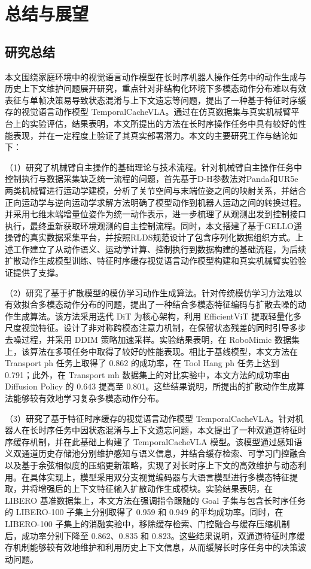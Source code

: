 \chapter{总结与展望}
\label{chp:conclusion}

\section{研究总结}
\label{sec:conclusion}

本文围绕家庭环境中的视觉语言动作模型在长时序机器人操作任务中的动作生成与历史上下文维护问题展开研究，重点针对非结构化环境下多模态动作分布难以有效表征与单帧决策易导致状态混淆与上下文遗忘等问题，提出了一种基于特征时序缓存的视觉语言动作模型 TemporalCacheVLA。通过在仿真数据集与真实机械臂平台上的实验评估，结果表明，本文所提出的方法在长时序操作任务中具有较好的性能表现，并在一定程度上验证了其真实部署潜力。本文的主要研究工作与结论如下：

（1）研究了机械臂自主操作的基础理论与技术流程。针对机械臂自主操作任务中控制执行与数据采集缺乏统一流程的问题，首先基于D-H参数法对Panda和UR5e两类机械臂进行运动学建模，分析了关节空间与末端位姿之间的映射关系，并结合正向运动学与逆向运动学求解方法明确了模型动作到机器人运动之间的转换过程。并采用七维末端增量位姿作为统一动作表示，进一步梳理了从观测出发到控制接口执行，最终重新获取环境观测的自主控制流程。同时，本文搭建了基于GELLO遥操臂的真实数据采集平台，并按照RLDS规范设计了包含序列化数据组织方式。上述工作建立了从动作语义、运动学计算、控制执行到数据构建的基础流程，为后续扩散动作生成模型训练、特征时序缓存视觉语言动作模型构建和真实机械臂实验验证提供了支撑。

（2）研究了基于扩散模型的模仿学习动作生成算法。针对传统模仿学习方法难以有效拟合多模态动作分布的问题，提出了一种结合多模态特征编码与扩散去噪的动作生成算法。该方法采用迭代 DiT 为核心架构，利用 EfficientViT 提取轻量化多尺度视觉特征。设计了非对称跨模态注意力机制，在保留状态残差的同时引导多步去噪过程，并采用 DDIM 策略加速采样。实验结果表明，在 RoboMimic 数据集上，该算法在多项任务中取得了较好的性能表现。相比于基线模型，本文方法在 Transport ph 任务上取得了 0.862 的成功率，在 Tool Hang ph 任务上达到 0.791；此外，在 Transport mh 数据集上的对比实验中，本文方法的成功率由 Diffusion Policy 的 0.643 提高至 0.801。这些结果说明，所提出的扩散动作生成算法能够较有效地学习复杂多模态动作分布。

（3）研究了基于特征时序缓存的视觉语言动作模型 TemporalCacheVLA。针对机器人在长时序任务中因状态混淆与上下文遗忘问题，本文提出了一种双通道特征时序缓存机制，并在此基础上构建了 TemporalCacheVLA 模型。该模型通过感知语义双通道历史存储池分别维护感知与语义信息，并结合缓存检索、可学习门控融合以及基于余弦相似度的压缩更新策略，实现了对长时序上下文的高效维护与动态利用。在具体实现上，模型采用双分支视觉编码器与大语言模型进行多模态特征提取，并将增强后的上下文特征输入扩散动作生成模块。实验结果表明，在 LIBERO 基准数据集上，本文方法在强调指令跟随的 Goal 子集与包含长时序任务的 LIBERO-100 子集上分别取得了 0.959 和 0.949 的平均成功率。同时，在 LIBERO-100 子集上的消融实验中，移除缓存检索、门控融合与缓存压缩机制后，成功率分别下降至 0.862、0.835 和 0.823。这些结果说明，双通道特征时序缓存机制能够较有效地维护和利用历史上下文信息，从而缓解长时序任务中的决策波动问题。

